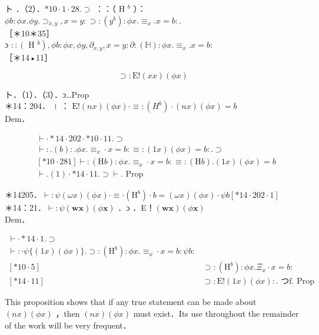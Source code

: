 \documentclass[10pt]{article}
\begin{document}
ト ．（2）．$* 10 \cdot 1 \cdot 28 . \supset$ ：：（ H $^{b}$ ）：$\phi b: \phi x . \phi y . \supset_{x, y}, x=y: \supset:\left(y^{b}\right): \phi x . \equiv_{x} . x=b:$.\\
［＊10＊35］\\
ɔ $::\left(\right.$ H $\left.^{b}\right), \phi b: \phi x, \phi y, \partial_{x, y}, x=y: \partial:(\mathbb{H}): \phi x . \equiv_{x} . x=b:$\\
［＊14•11］


\begin{equation*}
\supset: \mathrm{E}!(x x)(\phi x) \tag{3}
\end{equation*}


ト．（1）．（3）．ɔ…Prop\\
＊14：204． । ： $\mathrm{E}!(n x)(\phi x) \cdot \equiv:\left(H^{b}\right) \cdot(n x)(\phi x)=b$\\
Dem．


\begin{align*}
& \vdash \cdot * 14 \cdot 202 \cdot * 10 \cdot 11 . \supset \\
& \vdash: .(b): . \phi x . \equiv_{x} \cdot x=b: \equiv:(1 x)(\phi x)=b: . \supset \\
& {[* 10 \cdot 281] \vdash:(\mathrm{H} b): \phi x . \equiv_{x} \cdot x=b: \equiv:(\mathrm{H} b) .(1 x)(\phi x)=b}  \tag{1}\\
& \vdash .(1) \cdot * 14 \cdot 11 . \supset \vdash . \text { Prop }
\end{align*}


＊14205．$\vdash: \psi(\omega x)(\phi x) \cdot \equiv \cdot\left(\mathrm{H}^{b}\right) \cdot b=(\omega x)(\phi x) \cdot \psi b[* 14 \cdot 202 \cdot 1]$\\
＊14：21．$\vdash: \psi(\boldsymbol{w} \boldsymbol{x})(\phi \boldsymbol{x})$ ．ɔ ．E！$(\boldsymbol{w} \boldsymbol{x})(\phi \boldsymbol{x})$\\
Dem．

$$
\begin{array}{ll}
\vdash \cdot * 14 \cdot 1 . \supset & \\
\vdash: \cdot \psi\{(1 x)(\phi x)\} . \supset:\left(\mathrm{H}^{b}\right): \phi x . \equiv_{x} \cdot x=b: \psi b: \\
{[* 10 \cdot 5]} & \supset:\left(\mathrm{H}^{b}\right): \phi x . \Xi_{x} \cdot x=b: \\
{[* 14 \cdot 11]} & \supset: \mathrm{E}!(1 x)(\phi x): . \text { つf. Prop }
\end{array}
$$

This proposition shows that if any true statement can be made about $(n x)(\phi x)$ ，then $(n x)(\phi x)$ must exist．Its use throughout the remainder of the work will be very frequent．
\end{document}
